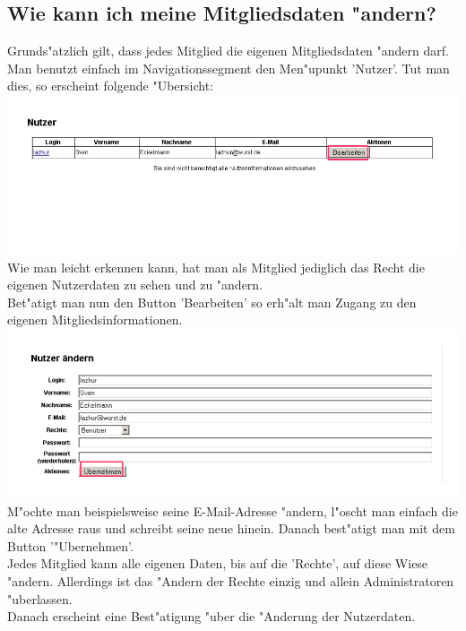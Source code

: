 \subsection{Wie kann ich meine Mitgliedsdaten "andern?}
Grunds"atzlich gilt, dass jedes Mitglied die eigenen Mitgliedsdaten "andern darf.\\ Man benutzt einfach im Navigationssegment den Men"upunkt 'Nutzer'. Tut man dies, so erscheint folgende "Ubersicht:\\
\includegraphics[scale=0.8]{nutzer1}\\
Wie man leicht erkennen kann, hat man als Mitglied jediglich das Recht die eigenen Nutzerdaten zu sehen und zu "andern.\\
Bet"atigt man nun den Button 'Bearbeiten' so erh"alt man Zugang zu den eigenen Mitgliedsinformationen.\\
\includegraphics[scale=0.8]{nutzer2}\\
M"ochte man beispielsweise seine E-Mail-Adresse "andern, l"oscht man einfach die alte Adresse raus und schreibt seine neue hinein. Danach best"atigt man mit dem Button '"Ubernehmen'.\\
Jedes Mitglied kann alle eigenen Daten, bis auf die 'Rechte', auf diese Wiese "andern. Allerdings ist das "Andern der Rechte einzig und allein Administratoren "uberlassen.\\
Danach erscheint eine Best"atigung "uber die "Anderung der Nutzerdaten.\\
